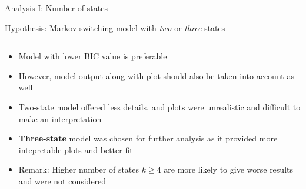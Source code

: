 \documentclass{beamer}
\begin{document}
\begin{frame}

Analysis I: Number of states

Hypothesis: Markov switching model with \textit{two} or \textit{three} states
\rule{\textwidth}{0.4pt}

\begin{itemize}
	\item Model with lower BIC value is preferable
	\item However, model output along with plot should also be taken into account as well
	\pause
	\item Two-state model offered less details, and plots were unrealistic and difficult to make an interpretation
	\item \textbf{Three-state} model was chosen for further analysis as it provided more intepretable plots and better fit
	\item \small{Remark: Higher number of states $k\geq4$ are more likely to give worse results and were not considered}
\end{itemize}

\end{frame}
\end{document}
